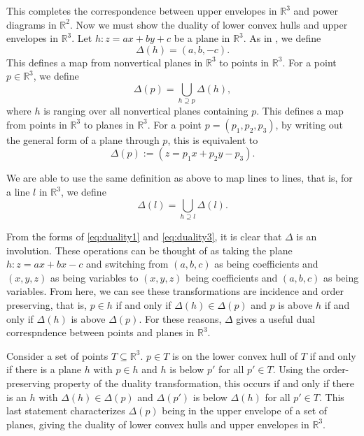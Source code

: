 \documentclass[a4paper, 11pt]{article}
\newcommand{\R}{\mathbb{R}}
\begin{document}
This completes the correspondence between upper envelopes in $\R^3$ and power diagrams in $\R^2$. Now we must show the duality of lower convex hulls
and upper envelopes in $\R^3$. Let $h: z = ax + by + c$ be a plane in $\R^3$. As in \cite{aurenhammer_power}, we define
\begin{equation}
  \Delta(h) = \left( a, b, -c \right).
  \label{eq:duality1}
\end{equation}
This defines a map from nonvertical planes in $\R^3$ to points in $\R^3$. For a point $p \in \R^3$, we define
\begin{equation}
  \Delta(p) = \bigcup_{h \supseteq p} \Delta(h),
  \label{eq:duality2}
\end{equation}
where $h$ is ranging over all nonvertical planes containing $p$. This defines a map from points in $\R^3$ to planes in $\R^3$. For a point $p = (p_1, p_2, p_3)$,
by writing out the general form of a plane through $p$, this is equivalent to
\begin{equation}
  \Delta(p) := (z = p_1 x + p_2 y - p_3).
  \label{eq:duality3}
\end{equation}

We are able to use the same definition as above to map lines to lines, that is, for a line $l$ in $\R^3$, we define
\begin{equation}
  \Delta(l) = \bigcup_{h \supseteq l} \Delta(l).
  \label{eq:duality4}
\end{equation}

From the forms of \eqref{eq:duality1} and \eqref{eq:duality3}, it is clear that $\Delta$ is an involution. These operations can be thought of as
taking the plane $h: z = ax + bx - c$ and switching from $(a,b,c)$ as being coefficients and $(x,y,z)$ as being variables to $(x,y,z)$ being
coefficients and $(a,b,c)$ as being variables. From here, we can see these transformations are incidence and order preserving, that is, $p \in h$ if and only if
$\Delta(h) \in \Delta(p)$ and $p$ is above $h$ if and only if $\Delta(h)$ is above $\Delta(p)$. For these reasons, $\Delta$ gives a useful dual
correspndence between points and planes in $\R^3$.

Consider a set of points $T \subseteq \R^3$. $p \in T$ is on the lower convex hull of $T$ if and only if there is a plane $h$ with $p \in h$ and $h$
is below $p'$ for all $p' \in T$. Using the order-preserving property of the duality transformation, this occurs if and only if there is an $h$ with $\Delta(h) \in
\Delta(p)$ and $\Delta(p')$ is below $\Delta(h)$ for all $p' \in T$. This last statement characterizes $\Delta(p)$ being in the upper envelope of a set of
planes, giving the duality of lower convex hulls and upper envelopes in $\R^3$.
\end{document}
